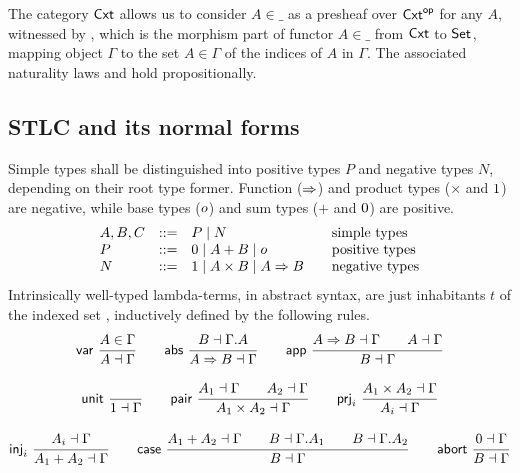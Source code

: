 \documentclass[a4paper,USenglish,cleveref, autoref]{lipics-v2019}
\begin{document}
The category $\mathsf{Cxt}$ allows us to consider $A{\in}\_$ as a presheaf over
$\mathsf{Cxt}^{\mathsf{op}}$ for any $A$, witnessed by , which is the morphism
part of functor $A{\in}\_$ from $\mathsf{Cxt}$ to $\mathsf{Set}_{}$, mapping object $\Gamma$ to the
set $A \in \Gamma$ of the indices of $A$ in $\Gamma$.
The associated naturality laws 
and  hold propositionally.

\subsection{STLC and its normal forms}

Simple types shall be distinguished into positive types $P$ and
negative types $N$, depending on their root type former.  Function
($\Rightarrow$) and product types ($\times$ and $1$) are negative,
while base types ($o$) and sum types ($+$ and $0$) are positive.
\[
\begin{array}{lrl@{\qquad}l}
  A,B,C & ::= & P \mid N & \mbox{simple types} \\
  P     & ::= & \tyzero \mid A + B \mid \tybase & \mbox{positive types} \\
  N     & ::= & \tyone \mid A \times B \mid A \To B
    & \mbox{negative types} \\
\end{array}
\]
Intrinsically well-typed lambda-terms, in abstract syntax,
are just inhabitants $t$ of the indexed set ,
inductively defined by the following rules.
\begin{gather*}
  \nru{\tvar}{A \in \Gamma}{A \from \Gamma}
\qquad
  \nru{\tabs}{B \from \cext \Gamma A}{A \To B \from \Gamma}
\qquad
  \nru{\tapp}
    {A \To B \from \Gamma \qquad A \from \Gamma}
    {B \from \Gamma}
\\[2ex]
  \nru{\tunit}{}{\tyone \from \Gamma}
\qquad
  \nru{\tpair}
    {A_1 \from \Gamma \qquad A_2 \from \Gamma}
    {A_1 \times A_2 \from \Gamma}
\qquad
  \nru{\tprj_i}
    {A_1 \times A_2 \from \Gamma}
    {A_i \from \Gamma}
\\[2ex]
  \nru{\tinj_i}
    {A_i \from \Gamma}
    {A_1 + A_2 \from \Gamma}
\qquad
  \nru{\tcase}
    {A_1 + A_2 \from \Gamma
      \qquad B \from \cext \Gamma A_1
      \qquad B \from \cext \Gamma A_2
    }{B \from \Gamma}
\qquad
  \nru{\tabort}
    {\tyzero \from \Gamma}
    {B \from \Gamma}
\end{gather*}
\end{document}
